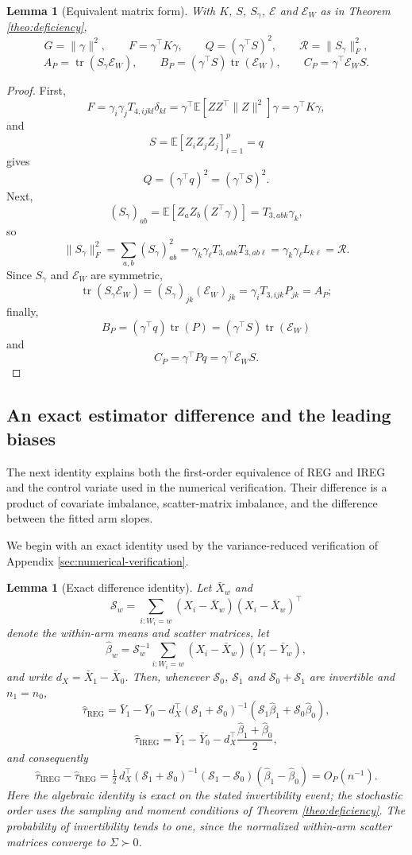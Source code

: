 \documentclass{article}
\newcommand{\EEE}{\mathbb{E}}
\newcommand{\htau}{\hat{\tau}}
\newcommand{\hbeta}{\hat{\beta}}
\DeclareMathOperator{\tr}{tr}
\newcommand{\IREG}{\mathrm{IREG}}
\newcommand{\REG}{\mathrm{REG}}
\theoremstyle{plain}
\newtheorem{lemm}[prop]{Lemma}
\theoremstyle{definition}
\theoremstyle{remark}
\begin{document}
\begin{lemm}[Equivalent matrix form]
\label{lemm:matrix}
With $K$, $S$, $S_\gamma$, $\mathcal E$ and $\mathcal E_W$ as in
Theorem \ref{theo:deficiency},
\[
G=\|\gamma\|^2,
\qquad
F=\gamma^\top K\gamma,
\qquad
Q=(\gamma^\top S)^2,
\qquad
\mathcal R=\|S_\gamma\|_F^2,
\]
\[
A_P=\tr(S_\gamma \mathcal E_W),
\qquad
B_P=(\gamma^\top S)\tr(\mathcal E_W),
\qquad
C_P=\gamma^\top \mathcal E_WS.
\]
\end{lemm}

\begin{proof}
First,
\[
F
=
\gamma_i\gamma_jT_{4,ijkl}\delta_{kl}
=
\gamma^\top \EEE[ZZ^\top\|Z\|^2]\gamma
=
\gamma^\top K\gamma,
\]
and
\[
S=\EEE[Z_iZ_jZ_j]_{i=1}^p=q
\]
gives
\[
Q=(\gamma^\top q)^2=(\gamma^\top S)^2.
\]
Next,
\[
(S_\gamma)_{ab}
=
\EEE[Z_aZ_b(Z^\top\gamma)]
=
T_{3,abk}\gamma_k,
\]
so
\[
\|S_\gamma\|_F^2
=
\sum_{a,b}(S_\gamma)_{ab}^2
=
\gamma_k\gamma_\ell T_{3,abk}T_{3,ab\ell}
=
\gamma_k\gamma_\ell L_{k\ell}
=
\mathcal R.
\]
Since $S_\gamma$ and $\mathcal E_W$ are symmetric,
\[
\tr(S_\gamma \mathcal E_W)
=
(S_\gamma)_{jk}(\mathcal E_W)_{jk}
=
\gamma_iT_{3,ijk}P_{jk}
=
A_P;
\]
finally,
\[
B_P
=
(\gamma^\top q)\tr(P)
=
(\gamma^\top S)\tr(\mathcal E_W)
\]
and
\[
C_P
=
\gamma^\top Pq
=
\gamma^\top \mathcal E_WS.
\]
\end{proof}

\subsection{An exact estimator difference and the leading biases}

The next identity explains both the first-order equivalence of REG
and IREG and the control variate used in the numerical verification.
Their difference is a product of covariate imbalance, scatter-matrix
imbalance, and the difference between the fitted arm slopes.

We begin with an exact identity used by the variance-reduced
verification of Appendix \ref{sec:numerical-verification}.

\begin{lemm}[Exact difference identity]
\label{lemm:exact_diff}
Let $\bar X_w$ and
\[
\mathcal S_w
=
\sum_{i:W_i=w}
(X_i-\bar X_w)(X_i-\bar X_w)^\top
\]
denote the within-arm means and scatter matrices, let
\[
\hbeta_w
=
\mathcal S_w^{-1}
\sum_{i:W_i=w}
(X_i-\bar X_w)(Y_i-\bar Y_w),
\]
and write $d_X=\bar X_1-\bar X_0$. Then, whenever
$\mathcal S_0$, $\mathcal S_1$ and $\mathcal S_0+\mathcal S_1$ are
invertible and $n_1=n_0$,
\[
\htau_\REG
=
\bar Y_1-\bar Y_0
-
d_X^\top
(\mathcal S_1+\mathcal S_0)^{-1}
(\mathcal S_1\hbeta_1+\mathcal S_0\hbeta_0),
\]
\[
\htau_\IREG
=
\bar Y_1-\bar Y_0
-
d_X^\top
\frac{\hbeta_1+\hbeta_0}{2},
\]
and consequently
\[
\htau_\IREG-\htau_\REG
=
\tfrac12\,d_X^\top
(\mathcal S_1+\mathcal S_0)^{-1}
(\mathcal S_1-\mathcal S_0)
(\hbeta_1-\hbeta_0)
=O_P(n^{-1}).
\]
Here the algebraic identity is exact on the stated invertibility
event; the stochastic order uses the sampling and moment conditions of Theorem \ref{theo:deficiency}.
The probability of invertibility tends to one, since the normalized
within-arm scatter matrices converge to $\Sigma\succ0$.
\end{lemm}
\end{document}

